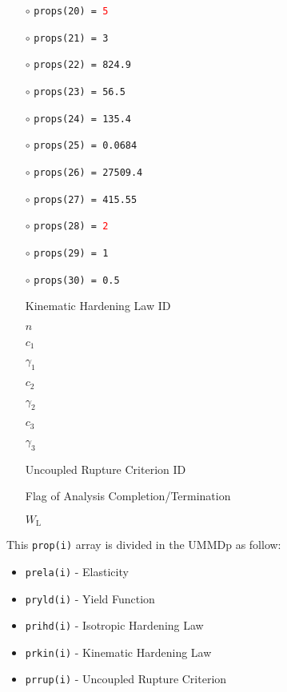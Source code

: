 \documentclass[11pt,a4paper,twoside,final,onecolumn,titlepage]{article}
\begin{document}
\noindent
\begin{minipage}{0.4\textwidth}
	\begin{itemize}
		\item[$\circ$] \texttt{props(20) = \textcolor{red}{5}}
		\item[$\circ$] \texttt{props(21) = 3}
		\item[$\circ$] \texttt{props(22) = 824.9}
		\item[$\circ$] \texttt{props(23) = 56.5} 
		\item[$\circ$] \texttt{props(24) = 135.4}
		\item[$\circ$] \texttt{props(25) = 0.0684}
		\item[$\circ$] \texttt{props(26) = 27509.4}
		\item[$\circ$] \texttt{props(27) = 415.55}
		\item[$\circ$] \texttt{props(28) = \textcolor{red}{2}}
		\item[$\circ$] \texttt{props(29) = 1}
		\item[$\circ$] \texttt{props(30) = 0.5}
		\item[] 
	\end{itemize} 
\end{minipage}
\begin{minipage}{0.6\textwidth}
	\begin{itemize}
		\item[] Kinematic Hardening Law ID
		\item[] $n$
		\item[] $c_1$
		\item[] $\gamma_1$
		\item[] $c_2$
		\item[] $\gamma_2$
		\item[] $c_3$
		\item[] $\gamma_3$
		\item[] Uncoupled Rupture Criterion ID
		\item[] Flag of Analysis Completion/Termination 
		\item[] $W_\textrm{L}$
		\item[] 
	\end{itemize}
\end{minipage}

\noindent This \texttt{prop(i)} array is divided in the UMMDp as follow:
\begin{itemize}
	\item \texttt{prela(i)} - Elasticity
	\item \texttt{pryld(i)} - Yield Function
	\item \texttt{prihd(i)} - Isotropic Hardening Law
	\item \texttt{prkin(i)} -  Kinematic Hardening Law
	\item \texttt{prrup(i)} -  Uncoupled Rupture Criterion\\
\end{itemize}
\end{document}
